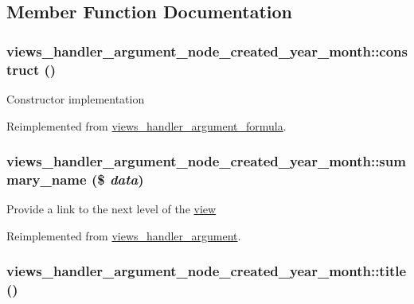 \subsection{Member Function Documentation}
\hypertarget{classviews__handler__argument__node__created__year__month_9e090c0caf0a169fe3f9a78160896d01}{
\subsubsection[{construct}]{\setlength{\rightskip}{0pt plus 5cm}views\_\-handler\_\-argument\_\-node\_\-created\_\-year\_\-month::construct ()}}
\label{classviews__handler__argument__node__created__year__month_9e090c0caf0a169fe3f9a78160896d01}


Constructor implementation 

Reimplemented from \hyperlink{classviews__handler__argument__formula_01284402427de2bcfa1b1da5792a2332}{views\_\-handler\_\-argument\_\-formula}.\hypertarget{classviews__handler__argument__node__created__year__month_05689c48f520a9f0a1dc0008050eae03}{
\subsubsection[{summary\_\-name}]{\setlength{\rightskip}{0pt plus 5cm}views\_\-handler\_\-argument\_\-node\_\-created\_\-year\_\-month::summary\_\-name (\$ {\em data})}}
\label{classviews__handler__argument__node__created__year__month_05689c48f520a9f0a1dc0008050eae03}


Provide a link to the next level of the \hyperlink{classview}{view} 

Reimplemented from \hyperlink{classviews__handler__argument_4c55a340453eed4d35c69f7ac790cac1}{views\_\-handler\_\-argument}.\hypertarget{classviews__handler__argument__node__created__year__month_80dd9527f548e32a8e8f9279fe0ec3d3}{
\subsubsection[{title}]{\setlength{\rightskip}{0pt plus 5cm}views\_\-handler\_\-argument\_\-node\_\-created\_\-year\_\-month::title ()}}
\label{classviews__handler__argument__node__created__year__month_80dd9527f548e32a8e8f9279fe0ec3d3}


